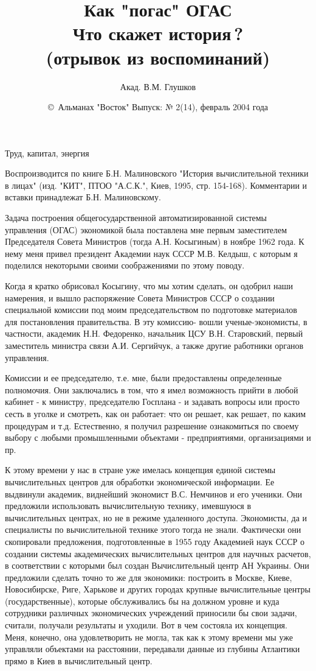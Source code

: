\documentclass{article}
\title{Как "погас" ОГАС\\Что скажет история\,?\\(отрывок из воспоминаний)}
\author{Акад. В.М. Глушков}
\date{\copyright\ Альманах "Восток" Выпуск: № 2(14), февраль 2004 года}
\begin{document}
\maketitle

Труд, капитал, энергия
\bigskip
 
Воспроизводится по книге
Б.Н. Малиновского "История вычислительной техники в лицах"
(изд. "КИТ", ПТОО "А.С.К.", Киев, 1995, стр. 154-168).
Комментарии и вставки принадлежат Б.Н. Малиновскому.
\bigskip

Задача построения общегосударственной автоматизированной системы управления
(ОГАС) экономикой была поставлена мне первым заместителем Председателя Совета
Министров (тогда А.Н. Косыгиным) в ноябре 1962 года. К нему меня привел
президент Академии наук СССР М.В. Келдыш, с которым я поделился некоторыми
своими соображениями по этому поводу.

Когда я кратко обрисовал Косыгину, что мы хотим сделать, он одобрил наши
намерения, и вышло распоряжение Совета Министров СССР о создании специальной
комиссии под моим председательством по подготовке материалов для постановления
правительства. В эту комиссию- вошли ученые-экономисты, в частности, академик
Н.Н. Федоренко, начальник ЦСУ В.Н. Старовский, первый заместитель министра связи
А.И. Сергийчук, а также другие работники органов управления.

Комиссии и ее председателю, т.е. мне, были предоставлены определенные
полномочия. Они заключались в том, что я имел возможность прийти в любой кабинет
- к министру, председателю Госплана - и задавать вопросы или просто сесть в
уголке и смотреть, как он работает: что он решает, как решает, по каким
процедурам и т.д. Естественно, я получил разрешение ознакомиться по своему
выбору с любыми промышленными объектами - предприятиями, организациями и пр.

К этому времени у нас в стране уже имелась концепция единой системы
вычислительных центров для обработки экономической информации. Ее выдвинули
академик, виднейший экономист В.С. Немчинов и его ученики. Они предложили
использовать вычислительную технику, имевшуюся в вычислительных центрах, но не в
режиме удаленного доступа. Экономисты, да и специалисты по вычислительной
технике этого тогда не знали. Фактически они скопировали предложения,
подготовленные в 1955 году Академией наук СССР о создании системы академических
вычислительных центров для научных расчетов, в соответствии с которыми был
создан Вычислительный центр АН Украины. Они предложили сделать точно то же для
экономики: построить в Москве, Киеве, Новосибирске, Риге, Харькове и других
городах крупные вычислительные центры (государственные), которые обслуживались
бы на должном уровне и куда сотрудники различных экономических учреждений
приносили бы свои задачи, считали, получали результаты и уходили. Вот в чем
состояла их концепция. Меня, конечно, она удовлетворить не могла, так как к
этому времени мы уже управляли объектами на расстоянии, передавали данные из
глубины Атлантики прямо в Киев в вычислительный центр.
\end{document}

